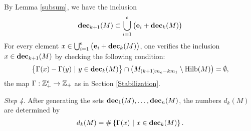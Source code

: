 By Lemma \ref{subsum}, we have the inclusion
\begin{align*}
\textbf{dec}_{k+1}(M)\subset\bigcup_{i=1}^e\big(\mathbf{e}_i+\textbf{dec}_k(M)\big)
\end{align*}
For every element $x\in\bigcup_{i=1}^e\big(\mathbf{e}_i+\textbf{dec}_k(M)\big)$,
one verifies the inclusion $x\in\textbf{dec}_{k+1}(M)$ by checking the following condition:
\begin{align*}
\big\{\Gamma(x)-\Gamma(y)\ |\ y\in\dec_k(M)\big\}\cap\big(M_{(k+1)m_e-km_1}\setminus\Hilb(M)\big)=\emptyset,
\end{align*} 
the map $\Gamma:\mathbb Z_+^e\to\mathbb Z_+$ as in Section \ref{Stabilization}.

\medskip\noindent\emph{Step 4.} After generating the sets $\textbf{dec}_1(M),\ldots,\textbf{dec}_n(M)$, the numbers $d_k(M)$ are determined by
\begin{align*}
d_k(M)=\#\left\{\Gamma(x)\ |\ x\in\textbf{dec}_k(M)\right\}.
\end{align*}

